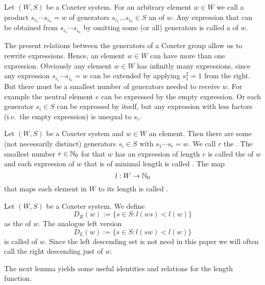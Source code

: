 \begin{defi}
	Let $(W,S)$ be a Coxeter system. For an arbitrary element $w \in W$ we call a product $s_{i_1} \cdots s_{i_n} = w$ of generators $s_{i_1} \ldots s_{i_n} \in S$ an  of $w$. Any expression that can be obtained from $s_{i_1} \cdots s_{i_n}$ by omitting some (or all) generators is called a  of $w$.
\end{defi}

The present relations between the generators of a Coxeter group allow us to rewrite expressions. Hence, an element $w \in W$ can have more than one expression. Obviously any element $w \in W$ has infinitly many expressions, since any expression $s_{i_1} \cdots s_{i_n} = w$ can be extended by applying $s_1^2 = 1$ from the right. But there must be a smallest number of generators needed to receive $w$. For example the neutral element $e$ can be expressed by the empty expression. Or each generator $s_i \in S$ can be expressed by itself, but any expression with less factors (i.e.\ the empty expression) is unequal to $s_i$.

\begin{defi}
	Let $(W,S)$ be a Coxeter system and $w \in W$ an element. Then there are some (not necessarily distinct) generators $s_i \in S$ with $s_1 \cdots s_r = w$. We call $r$ the . The smallest number $r \in \mathbb{N}_0$ for that $w$ has an expression of length $r$ is called the  of $w$ and each expression of $w$ that is of minimal length is called . The map
	$$ l : W \to \mathbb{N}_0 $$
	that maps each element in $W$ to its length is called .
\end{defi}

\begin{defi}
	Let $(W,S)$ be a Coxeter system. We define
	$$ D_R(w) := \{ s \in S : l(ws) < l(w) \} $$
	as the  of $w$. The analogue left version
	$$ D_L(w) := \{ s \in S : l(sw) < l(w) \} $$
	is called  of $w$. Since the left descending set is not need in this paper we will often call the right descending just  of $w$.
\end{defi}

The next lemma yields some useful identities and relations for the length function.

